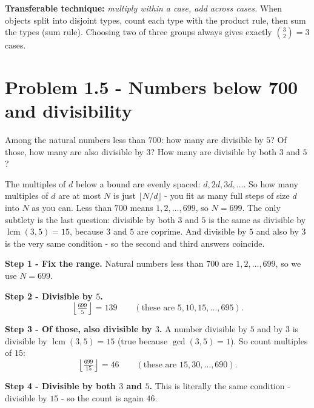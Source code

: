 \documentclass[11pt,a4paper]{article}
\begin{document}
\begin{methodbox}
\textbf{Transferable technique:} \emph{multiply within a case, add across cases.} When objects
split into disjoint types, count each type with the product rule, then sum the types (sum rule).
Choosing two of three groups always gives exactly $\binom{3}{2}=3$ cases.
\end{methodbox}

\section*{Problem 1.5 - Numbers below 700 and divisibility}

\begin{problembox}[1.5]
Among the natural numbers less than $700$: how many are divisible by $5$? Of those, how many are
also divisible by $3$? How many are divisible by both $3$ and $5$?
\end{problembox}

\begin{ideabox}
The multiples of $d$ below a bound are evenly spaced: $d,2d,3d,\dots$. So \textquotedbl{}how many
multiples of $d$ are at most $N$\textquotedbl{} is just $\lfloor N/d\rfloor$ - you fit as many full
steps of size $d$ into $N$ as you can. \textquotedbl{}Less than $700$\textquotedbl{} means
$1,2,\dots,699$, so $N=699$. The only subtlety is the last question: \textquotedbl{}divisible by
both $3$ and $5$\textquotedbl{} is the same as \textquotedbl{}divisible by $\operatorname{lcm}(3,5)=15$\textquotedbl{},
because $3$ and $5$ are coprime. And \textquotedbl{}divisible by $5$ and also by $3$\textquotedbl{}
is the very same condition - so the second and third answers coincide.
\end{ideabox}

\textbf{Step 1 - Fix the range.}
Natural numbers less than $700$ are $1,2,\dots,699$, so we use $N=699$.

\textbf{Step 2 - Divisible by $5$.}
\[
\left\lfloor \tfrac{699}{5}\right\rfloor = 139 \qquad(\text{these are } 5,10,15,\dots,695).
\]

\textbf{Step 3 - Of those, also divisible by $3$.}
A number divisible by $5$ and by $3$ is divisible by $\operatorname{lcm}(3,5)=15$ (true because
$\gcd(3,5)=1$). So count multiples of $15$:
\[
\left\lfloor \tfrac{699}{15}\right\rfloor = 46 \qquad(\text{these are } 15,30,\dots,690).
\]

\textbf{Step 4 - Divisible by both $3$ and $5$.}
This is literally the same condition - divisible by $15$ - so the count is again $46$.
\end{document}
